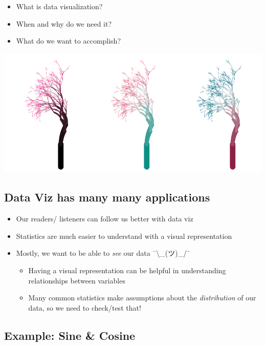 \documentclass[
]{book}
\providecommand{\tightlist}{%
  \setlength{\itemsep}{0pt}\setlength{\parskip}{0pt}}
\begin{document}
\begin{itemize}
\tightlist
\item
  What is data visualization?
\item
  When and why do we need it?
\item
  What do we want to accomplish?
\end{itemize}

\includegraphics{_main_files/figure-latex/unnamed-chunk-45-1.pdf}

\subsection{\texorpdfstring{Data Viz has many many applications }{Data Viz has many many applications }}\label{data-viz-has-many-many-applications}

\begin{itemize}
\tightlist
\item
  Our readers/ listeners can follow us better with data viz
\item
  Statistics are much easier to understand with a visual representation
\item
  Mostly, we want to be able to \emph{see} our data ¯\textbackslash\_(ツ)\_/¯

  \begin{itemize}
  \tightlist
  \item
    Having a visual representation can be helpful in understanding relationships between variables
  \item
    Many common statistics make assumptions about the \emph{distribution} of our data, so we need to check/test that!
  \end{itemize}
\end{itemize}

\subsection{Example: Sine \& Cosine}\label{example-sine-cosine}
\end{document}
